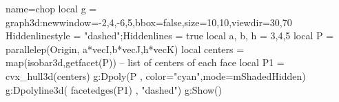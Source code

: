\documentclass[border=2 mm]{standalone}
\begin{document}
\begin{luadraw}{name=chop}
local g = graph3d:new{window={-2,4,-6,5},bbox=false,size={10,10},viewdir={30,70}}
Hiddenlinestyle = "dashed";Hiddenlines = true
local a, b, h = 3,4,5
local P = parallelep(Origin, a*vecI,b*vecJ,h*vecK)
local centers = map(isobar3d,getfacet(P)) -- list of centers of each face
local P1 = cvx_hull3d(centers)
g:Dpoly(P , {color="cyan",mode=mShadedHidden})
g:Dpolyline3d( facetedges(P1) , "dashed")
g:Show()
\end{luadraw}
\end{document}
